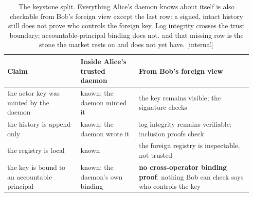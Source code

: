\begin{table}[H]
\centering
\caption{The keystone split. Everything Alice's daemon knows about itself is also checkable from Bob's foreign view except the last row: a signed, intact history still does not prove who controls the foreign key. Log integrity crosses the trust boundary; accountable-principal binding does not, and that missing row is the stone the market rests on and does not yet have. [internal]}
\label{tab:keystone-split}
\small
\renewcommand{\arraystretch}{1.15}
\begin{tabularx}{\linewidth}{@{}>{\raggedright\arraybackslash}X >{\raggedright\arraybackslash}X >{\raggedright\arraybackslash}X@{}}
\toprule
\textbf{Claim} & \textbf{Inside Alice's trusted daemon} & \textbf{From Bob's foreign view} \\
\midrule
the actor key was minted by the daemon & known: the daemon minted it & the key remains visible; the signature checks \\
the history is append-only & known: the daemon wrote it & log integrity remains verifiable; inclusion proofs check \\
the registry is local & known & the foreign registry is inspectable, not trusted \\
the key is bound to an accountable principal & known: the daemon's own binding & \textbf{no cross-operator binding proof}: nothing Bob can check says who controls the key \\
\bottomrule
\end{tabularx}
\end{table}
